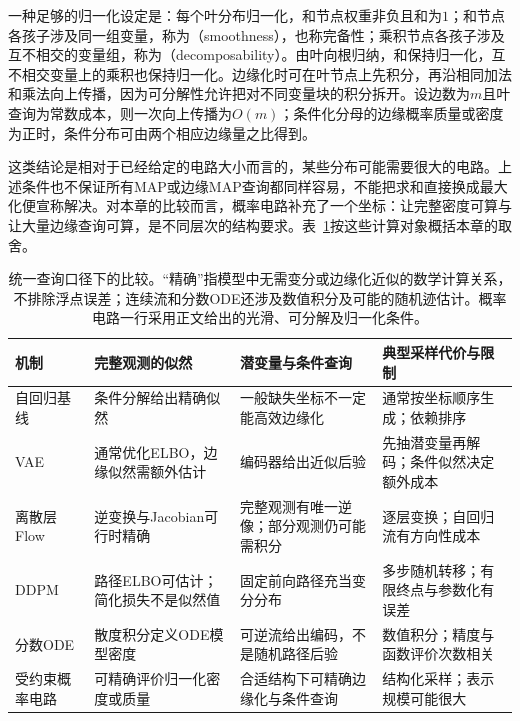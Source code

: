 一种足够的归一化设定是：每个叶分布归一化，和节点权重非负且和为$1$；和节点各孩子涉及同一组变量，称为（smoothness），也称完备性；乘积节点各孩子涉及互不相交的变量组，称为（decomposability）。由叶向根归纳，和保持归一化，互不相交变量上的乘积也保持归一化。边缘化时可在叶节点上先积分，再沿相同加法和乘法向上传播，因为可分解性允许把对不同变量块的积分拆开。设边数为$m$且叶查询为常数成本，则一次向上传播为$O(m)$；条件化分母的边缘概率质量或密度为正时，条件分布可由两个相应边缘量之比得到。

这类结论是相对于已经给定的电路大小而言的，某些分布可能需要很大的电路。上述条件也不保证所有MAP或边缘MAP查询都同样容易，不能把求和直接换成最大化便宣称解决。对本章的比较而言，概率电路补充了一个坐标：让完整密度可算与让大量边缘查询可算，是不同层次的结构要求。表~\ref{tab:pgm-generative-model-comparison}按这些计算对象概括本章的取舍。

\begin{table}[htbp]
  \centering
  \small
  \begin{tabularx}{\linewidth}{@{}lXXX@{}}
    \toprule
    机制 & 完整观测的似然 & 潜变量与条件查询 & 典型采样代价与限制 \\
    \midrule
    自回归基线
      & 条件分解给出精确似然
      & 一般缺失坐标不一定能高效边缘化
      & 通常按坐标顺序生成；依赖排序 \\
    VAE
      & 通常优化ELBO，边缘似然需额外估计
      & 编码器给出近似后验
      & 先抽潜变量再解码；条件似然决定额外成本 \\
    离散层Flow
      & 逆变换与Jacobian可行时精确
      & 完整观测有唯一逆像；部分观测仍可能需积分
      & 逐层变换；自回归流有方向性成本 \\
    DDPM
      & 路径ELBO可估计；简化损失不是似然值
      & 固定前向路径充当变分分布
      & 多步随机转移；有限终点与参数化有误差 \\
    分数ODE
      & 散度积分定义ODE模型密度
      & 可逆流给出编码，不是随机路径后验
      & 数值积分；精度与函数评价次数相关 \\
    受约束概率电路
      & 可精确评价归一化密度或质量
      & 合适结构下可精确边缘化与条件查询
      & 结构化采样；表示规模可能很大 \\
    \bottomrule
  \end{tabularx}
  \caption{统一查询口径下的比较。“精确”指模型中无需变分或边缘化近似的数学计算关系，不排除浮点误差；连续流和分数ODE还涉及数值积分及可能的随机迹估计。概率电路一行采用正文给出的光滑、可分解及归一化条件。}
  \label{tab:pgm-generative-model-comparison}
\end{table}

